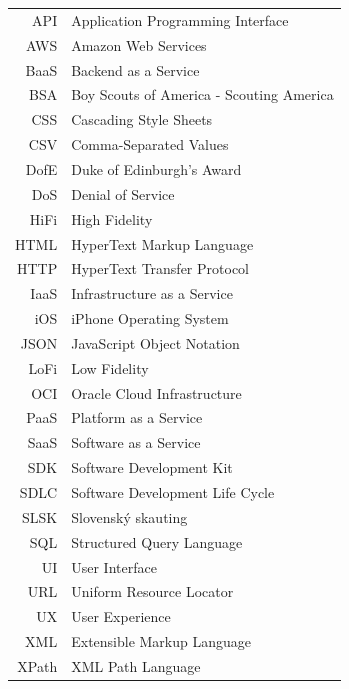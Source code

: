 \chapter{\thectufitabbreviationlabel}

\begin{tabular}{rl}
	API   & Application Programming Interface \\
	AWS   & Amazon Web Services \\
	BaaS  & Backend as a Service \\
	BSA   & Boy Scouts of America - Scouting America \\
	CSS   & Cascading Style Sheets \\
	CSV   & Comma-Separated Values \\
	DofE  & Duke of Edinburgh's Award \\
	DoS   & Denial of Service \\
	HiFi  & High Fidelity \\
	HTML  & HyperText Markup Language \\
	HTTP  & HyperText Transfer Protocol \\
	IaaS  & Infrastructure as a Service \\
	iOS   & iPhone Operating System \\
	JSON  & JavaScript Object Notation \\
	LoFi  & Low Fidelity \\
	OCI   & Oracle Cloud Infrastructure \\
	PaaS  & Platform as a Service \\
	SaaS  & Software as a Service \\
	SDK   & Software Development Kit \\
	SDLC  & Software Development Life Cycle \\
	SLSK  & Slovenský skauting \\
	SQL   & Structured Query Language \\
   UI    & User Interface \\
	URL   & Uniform Resource Locator \\
	UX    & User Experience \\
	XML   & Extensible Markup Language \\
	XPath & XML Path Language \\
\end{tabular}
